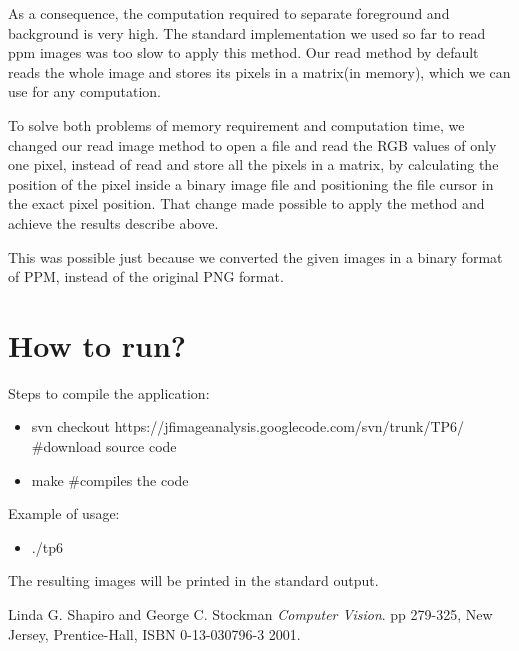 \documentclass{article}
\begin{document}
	As a consequence, the computation required to separate foreground and background is very high. The standard implementation we used so far to read ppm images was too slow to apply this method. Our read method by default reads the whole image and stores its pixels in a matrix(in memory), which we can use for any computation.

	To solve both problems of memory requirement and computation time, we changed our read image method to open a file and read the RGB values of only one pixel, instead of read and store all the pixels in a matrix, by calculating the position of the pixel inside a binary image file and positioning the file cursor in the exact pixel position. That change made possible to apply the method and achieve the results describe above.

	This was possible just because we converted the given images in a binary format of PPM, instead of the original PNG format.

\section{How to run?}

	Steps to compile the application:
	
	\begin{itemize}
		\item svn checkout https://jfimageanalysis.googlecode.com/svn/trunk/TP6/ \#download source code
		\item make \#compiles the code
	\end{itemize}


	Example of usage:

	\begin{itemize}
		\item ./tp6
	\end{itemize}

	The resulting images will be printed in the standard output.


\begin{thebibliography}{9}

	Linda G. Shapiro and George C. Stockman
 	\emph{Computer Vision}.
	pp 279-325, 
	New Jersey, Prentice-Hall, 
	ISBN 0-13-030796-3
 	2001.

\end{thebibliography}
\end{document}
